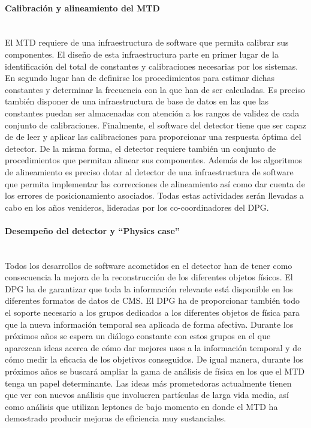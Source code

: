 \paragraph{Calibración y alineamiento del MTD\\\\}

El MTD requiere de una infraestructura de software que permita calibrar sus componentes. El diseño de esta infraestructura parte en primer lugar de la identificación del total de constantes y calibraciones necesarias por los sistemas. En segundo lugar han de definirse los procedimientos para estimar dichas constantes y determinar la frecuencia con la que han de ser calculadas. Es preciso también disponer de una infraestructura de base de datos en las que las constantes puedan ser almacenadas con atención a los rangos de validez de cada conjunto de calibraciones. Finalmente, el software del detector tiene que ser capaz de de leer y aplicar las calibraciones para proporcionar una respuesta óptima del detector. De la misma forma, el detector requiere también un conjunto de procedimientos que permitan alinear sus componentes. Además de los algoritmos de alineamiento es preciso dotar al detector de una infraestructura de software que permita implementar las correcciones de alineamiento así como dar cuenta de los errores de posicionamiento asociados. Todas estas actividades serán llevadas a cabo en los años venideros, lideradas por los co-coordinadores del DPG. 

\paragraph{Desempeño del detector y ``Physics case''\\\\}

Todos los desarrollos de software acometidos en el detector han de tener como consecuencia la mejora de la reconstrucción de los diferentes objetos físicos. El DPG ha de garantizar que toda la información relevante está disponible en los diferentes formatos de datos de CMS. El DPG ha de proporcionar también todo el soporte necesario a los grupos dedicados a los diferentes objetos de física para que la nueva información temporal sea aplicada de forma afectiva. Durante los próximos años se espera un diálogo constante con estos grupos en el que aparezcan ideas acerca de cómo dar mejores usos a la información temporal y de cómo medir la eficacia de los objetivos conseguidos. De igual manera, durante los próximos años se buscará ampliar la gama de análisis de física en los que el MTD tenga un papel determinante. Las ideas más prometedoras actualmente tienen que ver con nuevos análisis que involucren partículas de larga vida media, así como análisis que utilizan leptones de bajo momento en donde el MTD ha demostrado producir mejoras de eficiencia muy sustanciales.  

